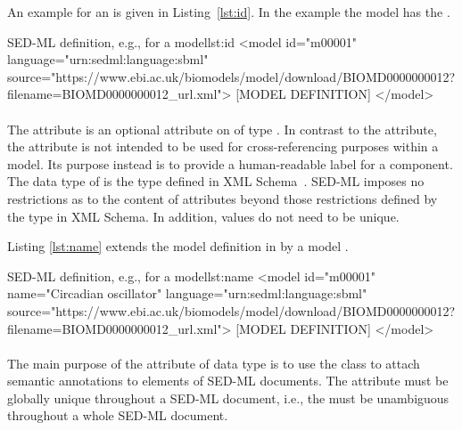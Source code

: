 An example for an  is given in Listing~\ref{lst:id}. In the example the model has the  .

\begin{myXmlLst}{SED-ML  definition, e.g., for a model}{lst:id}
<model id="m00001" language="urn:sedml:language:sbml"
        source="https://www.ebi.ac.uk/biomodels/model/download/BIOMD0000000012?filename=BIOMD0000000012_url.xml">
	[MODEL DEFINITION]
</model>
\end{myXmlLst}


\paragraph*{}
\label{sec:name}
The attribute  is an optional attribute on \SEDBase of type .  
In contrast to the  attribute, the  attribute
is not intended to be used for cross-referencing
purposes within a model.  Its purpose instead is to provide a
human-readable label for a component.  The data type of 
 is the type  defined in XML
Schema~\citep{biron:2000,thompson:2000}.  SED-ML imposes no restrictions
as to the content of  attributes beyond those restrictions
defined by the  type in XML Schema.
In addition,  values do not need to be unique.

Listing \ref{lst:name} extends the model definition in  by a model .

\begin{myXmlLst}{SED-ML  definition, e.g., for a model}{lst:name}
<model id="m00001" name="Circadian oscillator" language="urn:sedml:language:sbml"
        source="https://www.ebi.ac.uk/biomodels/model/download/BIOMD0000000012?filename=BIOMD0000000012_url.xml">
	[MODEL DEFINITION]
</model>
\end{myXmlLst}



\paragraph*{}
\label{sec:metaid}
The main purpose of the  attribute of data type  is to use the \Annotation class to attach semantic annotations to elements of SED-ML documents. The  attribute must be globally unique throughout a SED-ML document, i.e., the  must be unambiguous throughout a whole SED-ML document.

